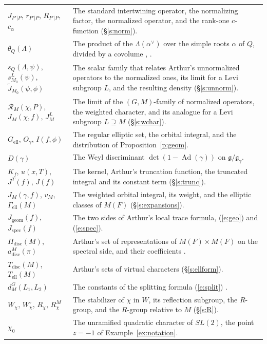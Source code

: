 \documentclass[12pt,letterpaper]{article}
\numberwithin{equation}{section}
\theoremstyle{plain}
\theoremstyle{definition}
\theoremstyle{remark}
\DeclareMathOperator{\Ad}{Ad}
\newcommand{\ellr}{\mathrm{ell}}
\newcommand{\Tell}{T_{\mathrm{ell}}}
\newcommand{\Tdisc}{T_{\mathrm{disc}}}
\begin{document}
{\begin{longtable}{@{}>{\raggedright\arraybackslash}p{}>{\raggedright\arraybackslash}p{}@{}}
$J_{P'|P}$, $r_{P'|P}$, $R_{P'|P}$, $c_\alpha$ & The standard intertwining operator, the normalizing factor, the normalized operator, and the rank-one $c$-function (\S\ref{s:norm}).\\
$\theta_Q(\Lambda)$ & The product of the $\Lambda(\alpha^\vee)$ over the simple roots $\alpha$ of $Q$, divided by a covolume \cite[\S6]{Ar81}, \cite[(2.16)]{JC26}.\\
$s_Q(\Lambda,\psi)$, $s^L_{M_0}(\psi)$, $\widetilde J_{M_0}(\psi,\phi)$ & The scalar family that relates Arthur's unnormalized operators to the normalized ones, its limit for a Levi subgroup $L$, and the resulting density (\S\ref{s:unnorm}).\\
$\mathcal R_M(\chi,P)$, $J_M(\chi,f)$, $J^L_M$ & The limit of the $(G,M)$-family of normalized operators, the weighted character, and its analogue for a Levi subgroup $L\supseteq M$ (\S\ref{s:wchar}).\\
$G_{\ellr}$, $O_\gamma$, $I(f,\phi)$ & The regular elliptic set, the orbital integral, and the distribution of Proposition~\ref{p:geom}.\\
$D(\gamma)$ & The Weyl discriminant $\det(1-\Ad(\gamma))$ on $\mathfrak g/\mathfrak g_\gamma$.\\
$K_f$, $u(x,T)$, $J^T(f)$, $J(f)$ & The kernel, Arthur's truncation function, the truncated integral and its constant term (\S\ref{s:trunc}).\\
$J_M(\gamma,f)$, $v_M$, $\Gamma_{\ellr}(M)$ & The weighted orbital integral, its weight, and the elliptic classes of $M(F)$ (\S\ref{s:expansions}).\\
$J_{\mathrm{geom}}(f)$, $J_{\mathrm{spec}}(f)$ & The two sides of Arthur's local trace formula, (\ref{e:geo}) and (\ref{e:spec}).\\
$\Pi_{\mathrm{disc}}(M)$, $a^M_{\mathrm{disc}}(\pi)$ & Arthur's set of representations of $M(F)\times M(F)$ on the spectral side, and their coefficients \cite[\S12]{Ar91}.\\
$\Tdisc(M)$, $\Tell(M)$ & Arthur's sets of virtual characters (\S\ref{s:ellform}).\\
$d_M^G(L_1,L_2)$ & The constants of the splitting formula (\ref{e:split}) \cite{Ar88}.\\
$W_\chi$, $W^\circ_\chi$, $R_\chi$, $R^M_\chi$ & The stabilizer of $\chi$ in $W$, its reflection subgroup, the $R$-group, and the $R$-group relative to $M$ (\S\ref{s:R}).\\
$\chi_0$ & The unramified quadratic character of $SL(2)$, the point $z=-1$ of Example~\ref{ex:notation}.\\

\end{longtable}}
\end{document}
